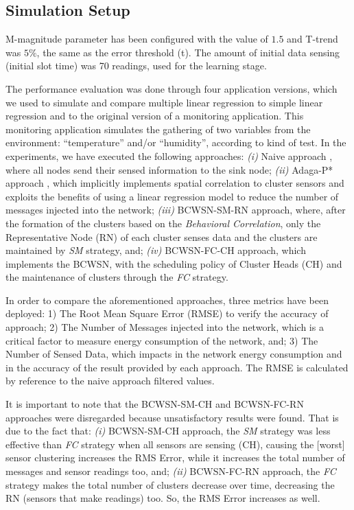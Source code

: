 \documentclass[conference]{IEEEtran}
\begin{document}
\subsection{Simulation Setup}
\label{data-and-experiments}

M-magnitude parameter has been configured with the value of $1.5$ and T-trend
was $5\%$, the same as the error threshold (t). The amount of initial data sensing
(initial slot time) was 70 readings, used for the learning stage.

The performance evaluation was done through four application versions, which we
used to simulate and compare multiple linear regression to simple linear
regression and to the original version of a monitoring application. This
monitoring application simulates the gathering of two variables from the
environment: ``temperature'' and/or ``humidity'', according to kind of test.
In the experiments, we have executed the following approaches: {\it
  (i)} Naive approach \cite{Madden2005}, where all nodes send their sensed
information to the sink node;  {\it
  (ii)} Adaga-P* approach \cite{MaiaACR2013} \cite{MaiaSAC2013}, which
implicitly implements spatial correlation to cluster sensors and exploits the
benefits of using a linear regression model to reduce the number of messages
injected into the network;  {\it
  (iii)} BCWSN-SM-RN approach, where, after the formation of the clusters based on the
\textit{Behavioral Correlation}, only the Representative Node (RN) of each
cluster senses data and the clusters are maintained by \textit{SM}
strategy, and;  {\it 
  (iv)} BCWSN-FC-CH approach, which implements the BCWSN, with the scheduling
policy of Cluster Heads (CH) and the maintenance of clusters through the
\textit{FC} strategy.

In order to compare the aforementioned approaches, three metrics have been
deployed: 1) The Root Mean Square Error (RMSE) to verify the accuracy of
approach; 2) The Number of Messages injected into the network, which is a
critical factor to measure energy consumption of the network, and; 3) The
Number of Sensed Data, which impacts in the network energy consumption and in
the accuracy of the result provided by each approach. The RMSE is calculated by
reference to the naive approach filtered values.

It is important to note that the BCWSN-SM-CH and BCWSN-FC-RN approaches were
disregarded because unsatisfactory results were found. That is due to the fact
that: {\it
  (i)} BCWSN-SM-CH approach, the \textit{SM} strategy was less effective than
  \textit{FC} strategy when all sensors are sensing (CH), causing the [worst]
  sensor clustering increases the RMS Error, while it increases the total number of
  messages and sensor readings too, and; {\it
  (ii)} BCWSN-FC-RN approach, the \textit{FC} strategy makes the total number of
  clusters decrease over time, decreasing the RN (sensors that make readings)
  too. So, the RMS Error increases as well.
\end{document}
